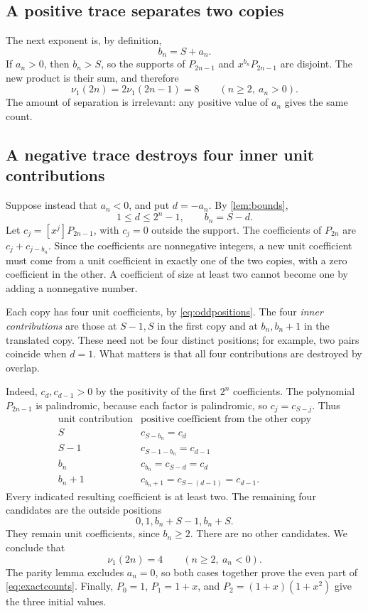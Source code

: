 \documentclass[11pt]{article}
\theoremstyle{definition}\newtheorem{definition}[theorem]{Definition}
\theoremstyle{remark}\newtheorem{remark}[theorem]{Remark}
\newcommand{\nuone}{\nu_1}
\begin{document}
\subsection{A positive trace separates two copies}

The next exponent is, by definition,
\begin{equation}\label{eq:bvsdegree}
 b_n=S+a_n.
\end{equation}
If $a_n>0$, then $b_n>S$, so the supports of $P_{2n-1}$ and $x^{b_n}P_{2n-1}$ are disjoint. The new product is their sum, and therefore
\[
 \nuone(2n)=2\nuone(2n-1)=8\qquad(n\geq2,\ a_n>0).
\]
The amount of separation is irrelevant: any positive value of $a_n$ gives the same count.

\subsection{A negative trace destroys four inner unit contributions}

Suppose instead that $a_n<0$, and put $d=-a_n$. By \cref{lem:bounds},
\begin{equation}\label{eq:dbound}
 1\leq d\leq2^n-1,\qquad b_n=S-d.
\end{equation}
Let $c_j=[x^j]P_{2n-1}$, with $c_j=0$ outside the support. The coefficients of $P_{2n}$ are $c_j+c_{j-b_n}$. Since the coefficients are nonnegative integers, a new unit coefficient must come from a unit coefficient in exactly one of the two copies, with a zero coefficient in the other. A coefficient of size at least two cannot become one by adding a nonnegative number.

Each copy has four unit coefficients, by \eqref{eq:oddpositions}. The four \emph{inner contributions} are those at $S-1,S$ in the first copy and at $b_n,b_n+1$ in the translated copy. These need not be four distinct positions; for example, two pairs coincide when $d=1$. What matters is that all four contributions are destroyed by overlap.

Indeed, $c_d,c_{d-1}>0$ by the positivity of the first $2^n$ coefficients. The polynomial $P_{2n-1}$ is palindromic, because each factor is palindromic, so $c_j=c_{S-j}$. Thus
\[
 \begin{array}{c|c}
 \text{unit contribution}&\text{positive coefficient from the other copy}\\ \hline
 S&c_{S-b_n}=c_d\\
 S-1&c_{S-1-b_n}=c_{d-1}\\
 b_n&c_{b_n}=c_{S-d}=c_d\\
 b_n+1&c_{b_n+1}=c_{S-(d-1)}=c_{d-1}.
 \end{array}
\]
Every indicated resulting coefficient is at least two. The remaining four candidates are the outside positions
\[
 0,1,b_n+S-1,b_n+S.
\]
They remain unit coefficients, since $b_n\geq2$. There are no other candidates. We conclude that
\[
 \nuone(2n)=4\qquad(n\geq2,\ a_n<0).
\]
The parity lemma excludes $a_n=0$, so both cases together prove the even part of \eqref{eq:exactcounts}. Finally, $P_0=1$, $P_1=1+x$, and $P_2=(1+x)(1+x^2)$ give the three initial values.
\end{document}
